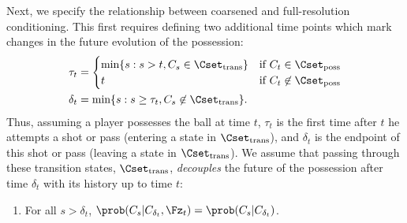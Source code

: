 \documentclass[EPV_JASA.tex]{subfiles}
\begin{document}
Next, we specify the relationship between coarsened and full-resolution conditioning. This first requires defining two additional time points which mark changes in the future evolution of the possession:
\begin{align}
\tau_t & = \begin{cases}
\text{min} \{ s : s > t, C_s \in \Cset_{\text{trans}}\} & \text{if } C_t \in \Cset_{\text{poss}} \\
t & \text{if } C_t \not \in \Cset_{\text{poss}}
\end{cases} \label{taudef} \\
\delta_t &= \text{min}\{s : s \geq \tau_t, C_s \not \in \Cset_{\text{trans}} \}
\label{deltadef}.
\end{align}
Thus, assuming a player possesses the ball at time $t$, $\tau_t$ is the first time after $t$ he attempts a shot or pass (entering a state in $\Cset_{\text{trans}}$), and $\delta_t$ is the endpoint of this shot or pass (leaving a state in $\Cset_{\text{trans}}$). We assume that passing through these transition states, $\Cset_{\text{trans}}$, \textit{decouples} the future of the possession after time $\delta_t$ with its history up to time $t$:
\begin{enumerate}[label=(A\arabic*),resume]
\item For all $s > \delta_t$, $\prob(C_s | C_{\delta_t}, \Fz_t) = \prob(C_s | C_{\delta_t})$. \label{A2} %
\end{enumerate}
\end{document}
